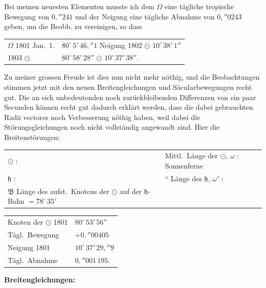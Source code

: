 \documentclass[12pt,a4paper]{article}
\newcommand{\Ceres}{\odot}
\newcommand{\Jupiter}{\mathfrak{h}}
\begin{document}
Bei meinen neuesten Elementen musste ich dem $\Omega$ eine tägliche tropische Bewegung von $0{,}''241$ und der Neigung eine tägliche Abnahme von $0{,}''0243$ geben, um die Beobb. zu vereinigen, so dass
\begin{center}
\begin{tabular}{l@{\quad}l}
$\Omega$ 1801 Jan.~1. & $80^\circ\,5'\,46{,}''1$ \quad Neigung 1802 $\Ceres$ $10^\circ\,38'\,1''$\\
1803 $\Ceres$ & $80^\circ\,58'\,28''$ \quad\quad 1804 $\Ceres$ $10^\circ\,37'\,38''$.
\end{tabular}
\end{center}

\newpage
\setcounter{page}{418}
%
Zu meiner grossen Freude ist dies nun nicht mehr nöthig, und die Beobachtungen stimmen jetzt mit den neuen Breitengleichungen und Säcularbewegungen recht gut. Die an sich unbedeutenden noch zurückbleibenden Differenzen von ein paar Secunden können recht gut dadurch erklärt werden, dass die dabei gebrauchten Radii vectores noch Verbesserung nöthig haben, weil dabei die Störungsgleichungen noch nicht vollständig angewandt sind. Hier die Breitenstörungen:

\medskip
\begin{tabular}{l@{\ }l}
$\Ceres$ : & Mittl.~Länge der $\Ceres$, $\omega$ : Sonnenferne\\
$\Jupiter$ : & `` Länge des $\Jupiter$, $\omega'$ :\\
$\mathfrak{B}$ Länge des aufst.~Knotens der $\Ceres$ auf der $\Jupiter$-Bahn $= 78^\circ\,35'$
\end{tabular}

\begin{center}
\begin{tabular}{l@{\quad}l}
Knoten der $\Ceres$ 1801 & $80^\circ\,53'\,56''$\\
Tägl.~Bewegung & $+0{,}''00405$\\
Neigung 1801 & $10^\circ\,37'\,29{,}''9$\\
Tägl.~Abnahme & $0{,}''001\,195$.
\end{tabular}
\end{center}

\medskip\noindent\textbf{Breitengleichungen:}
\end{document}
